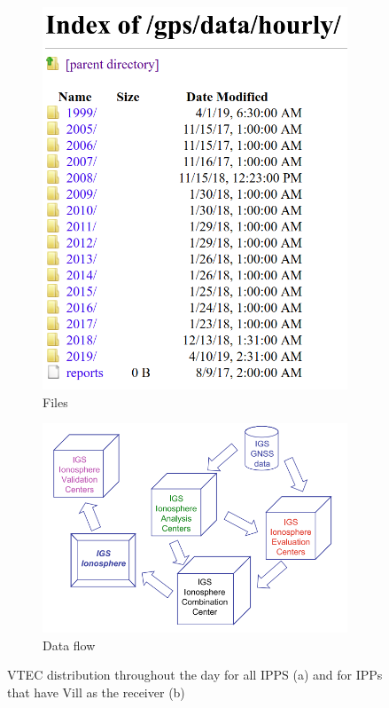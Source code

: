 \begin{figure}[!htb]
	\begin{subfigure}[b]{0.3\textwidth}
		\includegraphics[width=\linewidth]{images/ch4/FTPNASA.png}
		\caption{Files}
	\end{subfigure}
	\hfill
	\begin{subfigure}[b]{0.5\textwidth}
		\includegraphics[width=\linewidth]{images/ch4/DataFlowIGS.png}
		\caption{Data flow}
	\end{subfigure}
	\caption{VTEC distribution throughout the day for all IPPS (a) and for IPPs that have Vill as the receiver (b)}
	\label{fig:exampleCDDIS}
\end{figure}


